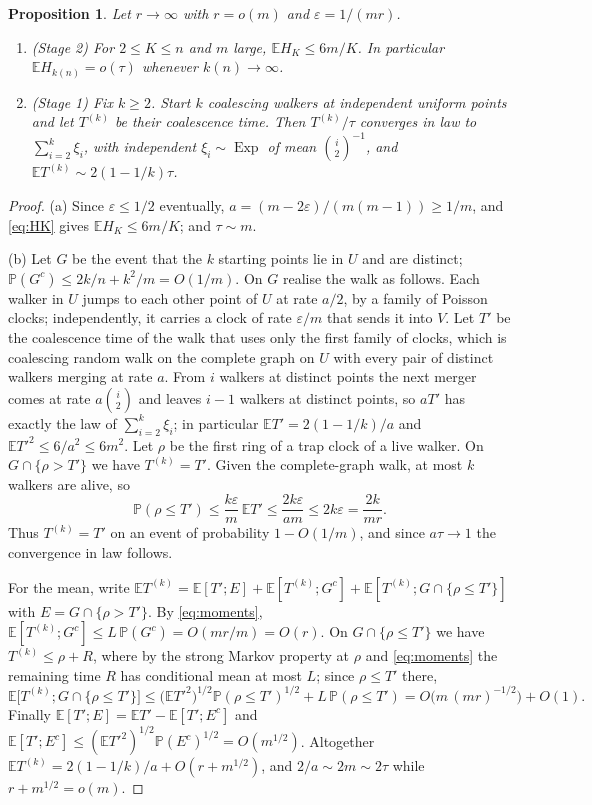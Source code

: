 \documentclass[11pt,a4paper]{article}
\numberwithin{equation}{section}
\newtheorem{proposition}[theorem]{Proposition}
\theoremstyle{remark}
\newcommand{\E}{\mathbb E}
\newcommand{\Pp}{\mathbb P}
\newcommand{\eps}{\varepsilon}
\newcommand{\Exp}{\operatorname{Exp}}
\begin{document}
\begin{proposition}\label{prop:stages}
Let $r\to\infty$ with $r=o(m)$ and $\eps=1/(mr)$.
\begin{enumerate}[label=\textup{(\alph*)}]
\item \textup{(Stage 2)} For $2\le K\le n$ and $m$ large, $\E H_K\le 6m/K$. In particular $\E H_{k(n)}=o(\tau)$ whenever $k(n)\to\infty$.
\item \textup{(Stage 1)} Fix $k\ge2$. Start $k$ coalescing walkers at independent uniform points and let $T^{(k)}$ be their coalescence time. Then $T^{(k)}/\tau$ converges in law to $\sum_{i=2}^k\xi_i$, with independent $\xi_i\sim\Exp$ of mean $\binom i2^{-1}$, and $\E T^{(k)}\sim2(1-1/k)\tau$.
\end{enumerate}
\end{proposition}

\begin{proof}
(a) Since $\eps\le1/2$ eventually, $a=(m-2\eps)/(m(m-1))\ge1/m$, and \eqref{eq:HK} gives $\E H_K\le6m/K$; and $\tau\sim m$.

(b) Let $G$ be the event that the $k$ starting points lie in $U$ and are distinct; $\Pp(G^c)\le2k/n+k^2/m=O(1/m)$. On $G$ realise the walk as follows. Each walker in $U$ jumps to each other point of $U$ at rate $a/2$, by a family of Poisson clocks; independently, it carries a clock of rate $\eps/m$ that sends it into $V$. Let $T'$ be the coalescence time of the walk that uses only the first family of clocks, which is coalescing random walk on the complete graph on $U$ with every pair of distinct walkers merging at rate $a$. From $i$ walkers at distinct points the next merger comes at rate $a\binom i2$ and leaves $i-1$ walkers at distinct points, so $aT'$ has exactly the law of $\sum_{i=2}^k\xi_i$; in particular $\E T'=2(1-1/k)/a$ and $\E T'^2\le6/a^2\le6m^2$. Let $\rho$ be the first ring of a trap clock of a live walker. On $G\cap\{\rho>T'\}$ we have $T^{(k)}=T'$. Given the complete-graph walk, at most $k$ walkers are alive, so
\[
\Pp(\rho\le T')\le\frac{k\eps}m\,\E T'\le\frac{2k\eps}{am}\le2k\eps=\frac{2k}{mr}.
\]
Thus $T^{(k)}=T'$ on an event of probability $1-O(1/m)$, and since $a\tau\to1$ the convergence in law follows.

For the mean, write $\E T^{(k)}=\E[T';E]+\E[T^{(k)};G^c]+\E[T^{(k)};G\cap\{\rho\le T'\}]$ with $E=G\cap\{\rho>T'\}$. By \eqref{eq:moments}, $\E[T^{(k)};G^c]\le L\,\Pp(G^c)=O(mr/m)=O(r)$. On $G\cap\{\rho\le T'\}$ we have $T^{(k)}\le\rho+R$, where by the strong Markov property at $\rho$ and \eqref{eq:moments} the remaining time $R$ has conditional mean at most $L$; since $\rho\le T'$ there,
\[
\E\bigl[T^{(k)};G\cap\{\rho\le T'\}\bigr]\le\bigl(\E T'^2\bigr)^{1/2}\Pp(\rho\le T')^{1/2}+L\,\Pp(\rho\le T')=O\bigl(m\,(mr)^{-1/2}\bigr)+O(1).
\]
Finally $\E[T';E]=\E T'-\E[T';E^c]$ and $\E[T';E^c]\le(\E T'^2)^{1/2}\Pp(E^c)^{1/2}=O(m^{1/2})$. Altogether $\E T^{(k)}=2(1-1/k)/a+O(r+m^{1/2})$, and $2/a\sim2m\sim2\tau$ while $r+m^{1/2}=o(m)$.
\end{proof}
\end{document}
